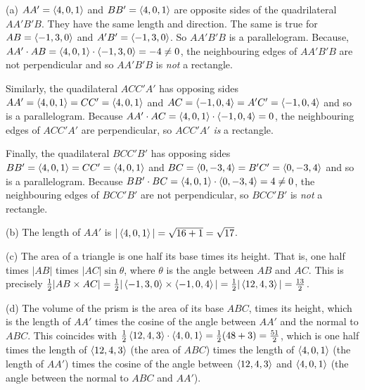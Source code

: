 \begin{solution}
(a) $AA'=\left< 4,0,1\right> $ and $BB'=\left< 4,0,1\right> $ are opposite sides
of the quadrilateral $AA'B'B$. They have the same length 
and direction. The same is true for $AB=\left< -1,3,0\right> $ and 
$A'B'=\left< -1,3,0\right> $. So $AA'B'B$ is a parallelogram. Because, 
$AA'\cdot AB=\left< 4,0,1\right> \cdot\left< -1,3,0\right> =-4\ne 0$, 
the neighbouring edges of $AA'B'B$ are not perpendicular and so $AA'B'B$ 
is \emph{not} a rectangle.

Similarly, the quadilateral $ACC'A'$ has opposing sides
$AA'=\left< 4,0,1\right> =CC'=\left< 4,0,1\right> $ and 
$AC=\left< -1,0,4\right> =A'C'=\left< -1,0,4\right> $ and so is
a parallelogram. Because $AA'\cdot AC=\left< 4,0,1\right> \cdot\left< -1,0,4\right> = 0$, the neighbouring edges of $ACC'A'$ are perpendicular, so
$ACC'A'$ \emph{is} a rectangle.

Finally, the quadilateral $BCC'B'$ has opposing sides
$BB'=\left< 4,0,1\right> =CC'=\left< 4,0,1\right> $ and 
$BC=\left< 0,-3,4\right> =B'C'=\left< 0,-3,4\right> $ and so is
a parallelogram. Because $BB'\cdot BC=\left< 4,0,1\right> \cdot\left< 0,-3,4\right> 
= 4\ne 0$, the neighbouring edges of $BCC'B'$ are not perpendicular, so 
$BCC'B'$ is \emph{not} a rectangle.

(b) The length of $AA'$ is $|\left< 4,0,1\right> |=\sqrt{16+1}=\sqrt{17}$.

(c) The area of a triangle is one half its base times its height. 
That is, one half times $|AB|$ times $|AC|\sin\theta$, where 
$\theta$ is the angle between $AB$ and $AC$. This is precisely 
$\tfrac{1}{2} |AB\times AC|=\tfrac{1}{2}|\left< -1,3,0\right> \times\left< -1,0,4\right> | 
=\tfrac{1}{2} |\left< 12,4,3\right>|=\frac{13}{2}$.

(d) The volume of the prism is the area of its base $ABC$,
 times its height, which is the length of $AA'$ times the cosine of the
angle between $AA'$ and the normal to $ABC$. This coincides with
$\tfrac{1}{2} \left< 12,4,3\right> \cdot\left< 4,0,1\right> =\tfrac{1}{2}(48+3)=\frac{51}{2}$, which is 
one half times the length of $\left< 12,4,3\right> $ (the area of $ABC$) 
times the length of $\left< 4,0,1\right> $ (the length of $AA'$) times the 
cosine of the angle between $\left< 12,4,3\right> $ and
$\left< 4,0,1\right> $ (the angle between the normal to $ABC$ and $AA'$).

\end{solution}

